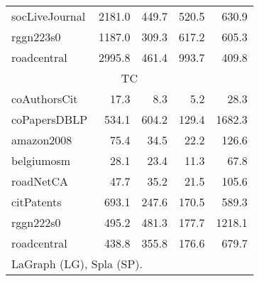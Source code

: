 \begin{table}[tbp]
\begin{center}
\begin{tabular}{|l|r|r|r|r|}
        \rowcolor{black!2 } socLiveJournal&2181.0&449.7&520.5&630.9\\
        \rowcolor{black!10} rggn223s0&1187.0&309.3&617.2&605.3\\
        \rowcolor{black!2 } roadcentral&2995.8&461.4&993.7&409.8\\
        \hline
        \hline
        \multicolumn{5}{|c|}{TC} \\
        \hline
        \rowcolor{black!10} coAuthorsCit&17.3&8.3&5.2&28.3\\
        \rowcolor{black!2 } coPapersDBLP&534.1&604.2&129.4&1682.3\\
        \rowcolor{black!10} amazon2008&75.4&34.5&22.2&126.6\\
        \rowcolor{black!2 } belgiumosm&28.1&23.4&11.3&67.8\\
        \rowcolor{black!10} roadNetCA&47.7&35.2&21.5&105.6\\
        \rowcolor{black!2 } citPatents&693.1&247.6&170.5&589.3\\
        \rowcolor{black!10} rggn222s0&495.2&481.3&177.7&1218.1\\
        \rowcolor{black!2 } roadcentral&438.8&355.8&176.6&679.7\\
        \hline
        \hline
        \multicolumn{5}{l}{LaGraph (LG), Spla (SP).} \\
        \end{tabular}
        \label{rq3_table}
    \end{center}
    \end{table}    